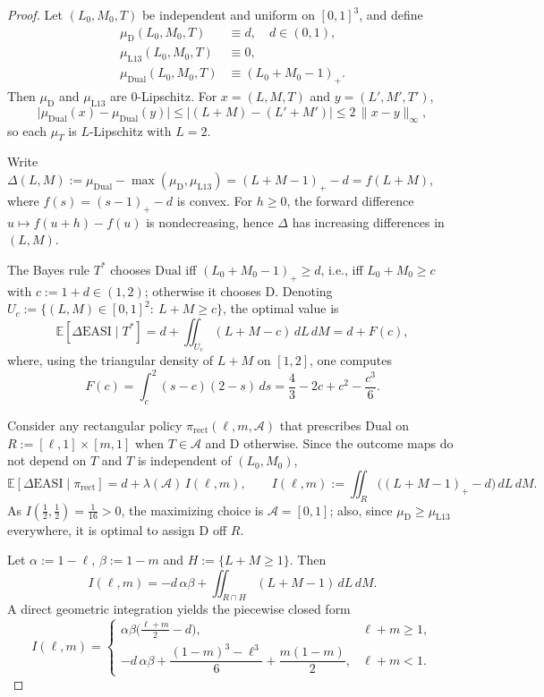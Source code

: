 \begin{proof}
Let $(L_0,M_0,T)$ be independent and uniform on $[0,1]^3$, and define
\[
\begin{aligned}
\mu_{\mathrm D}(L_0,M_0,T) &\equiv d,\quad d\in(0,1),\\
\mu_{\mathrm{L13}}(L_0,M_0,T) &\equiv 0,\\
\mu_{\mathrm{Dual}}(L_0,M_0,T) &\equiv (L_0+M_0-1)_+.
\end{aligned}
\]
Then $\mu_{\mathrm D}$ and $\mu_{\mathrm{L13}}$ are $0$-Lipschitz. For $x=(L,M,T)$ and $y=(L',M',T')$,
\[
\bigl|\mu_{\mathrm{Dual}}(x)-\mu_{\mathrm{Dual}}(y)\bigr|\le |(L+M)-(L'+M')|\le 2\,\lVert x-y\rVert_\infty,
\]
so each $\mu_T$ is $L$-Lipschitz with $L=2$.

Write $\Delta(L,M):=\mu_{\mathrm{Dual}}-\max(\mu_{\mathrm D},\mu_{\mathrm{L13}})=(L+M-1)_+-d=f(L+M)$, where $f(s)=(s-1)_+-d$ is convex. For $h\ge0$, the forward difference $u\mapsto f(u+h)-f(u)$ is nondecreasing, hence $\Delta$ has increasing differences in $(L,M)$.

The Bayes rule $T^{*}$ chooses $\mathrm{Dual}$ iff $(L_0+M_0-1)_+\ge d$, i.e., iff $L_0+M_0\ge c$ with $c:=1+d\in(1,2)$; otherwise it chooses $\mathrm D$. Denoting $U_c:=\{(L,M)\in[0,1]^2:\ L+M\ge c\}$, the optimal value is
\[
\mathbb{E}[\Delta\mathrm{EASI}\mid T^{*}]
= d + \iint_{U_c} (L+M-c)\,dL\,dM 
= d + F(c),
\]
where, using the triangular density of $L+M$ on $[1,2]$, one computes
\[
F(c)=\int_c^2 (s-c)(2-s)\,ds=\frac{4}{3}-2c+c^2-\frac{c^3}{6}.\tag{1}
\]

Consider any rectangular policy $\pi_{\mathrm{rect}}(\ell,m,\mathcal A)$ that prescribes $\mathrm{Dual}$ on $R:=[\ell,1]\times[m,1]$ when $T\in\mathcal A$ and $\mathrm D$ otherwise. Since the outcome maps do not depend on $T$ and $T$ is independent of $(L_0,M_0)$,
\[
\mathbb{E}[\Delta\mathrm{EASI}\mid \pi_{\mathrm{rect}}]=d+\lambda(\mathcal A)\,I(\ell,m),\qquad I(\ell,m):=\iint_{R}\bigl((L+M-1)_+-d\bigr)\,dL\,dM.
\]
As $I(\tfrac12,\tfrac12)=\tfrac1{16}>0$, the maximizing choice is $\mathcal A=[0,1]$; also, since $\mu_{\mathrm D}\ge\mu_{\mathrm{L13}}$ everywhere, it is optimal to assign $\mathrm D$ off $R$.

Let $\alpha:=1-\ell$, $\beta:=1-m$ and $H:=\{L+M\ge 1\}$. Then
\[
I(\ell,m)=-d\,\alpha\beta+\iint_{R\cap H}(L+M-1)\,dL\,dM.
\]
A direct geometric integration yields the piecewise closed form
\[
I(\ell,m)=\begin{cases}
\alpha\beta\Big(\tfrac{\ell+m}{2}-d\Big), & \ell+m\ge 1,\\[3pt]
-d\,\alpha\beta + \dfrac{(1-m)^3-\ell^3}{6}+\dfrac{m(1-m)}{2}, & \ell+m<1.
\end{cases}\tag{2}
\]


\end{proof}
